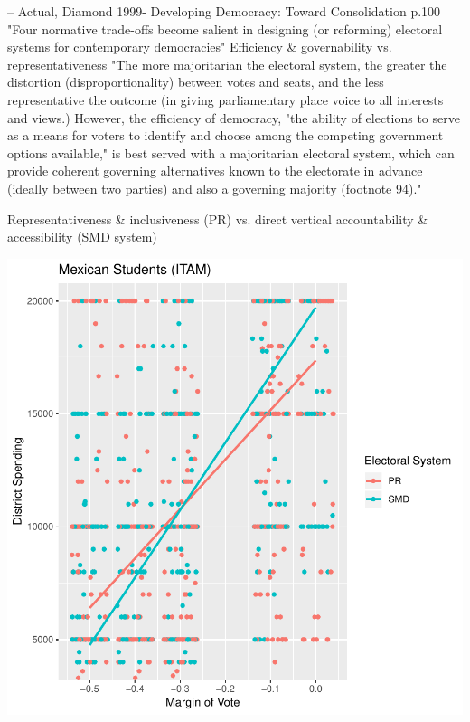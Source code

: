 \documentclass{article}
\begin{document}
--
Actual, Diamond 1999- Developing Democracy: Toward Consolidation p.100
"Four normative trade-offs become salient in designing (or reforming) electoral systems for contemporary democracies"
Efficiency \& governability vs. representativeness
"The more majoritarian the electoral system, the greater the distortion (disproportionality) between votes and seats, and the less representative the outcome (in giving parliamentary place voice to all interests and views.) However, the efficiency of democracy, "the ability of elections to serve as a means for voters to identify and choose among the competing government options available," is best served with a majoritarian electoral system, which can provide coherent governing alternatives known to the electorate in advance (ideally between two parties) and also a governing majority (footnote 94)."

Representativeness \& inclusiveness (PR) vs. direct vertical accountability \& accessibility (SMD system)

\fi



\includegraphics{Dilgin_MPSA-002}






\end{document}

